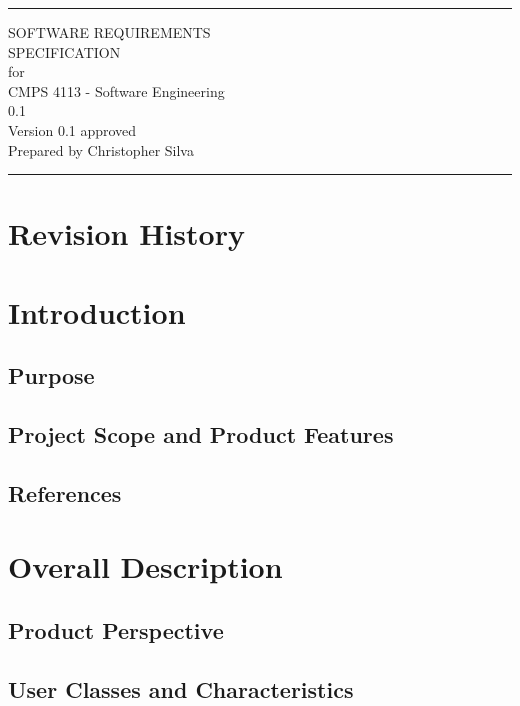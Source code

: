 \documentclass{scrreprt}
\author{Christopher Silva}
\date{}
\def\myversion{0.1 }
\begin{document}
	\begin{titlepage}
		\flushright
		\rule{16cm}{5pt}\vskip1cm
		\Huge{SOFTWARE REQUIREMENTS\\ SPECIFICATION}\\
		\vspace{2cm}
		for\\
		\vspace{2cm}
		CMPS 4113 - Software Engineering\\
		\vspace{2cm}
		\LARGE{\myversion\\}
		\vspace{2cm}
		\LARGE{Version \myversion approved\\}
		\vspace{2cm}
		Prepared by Christopher Silva\\
		\vfill
		\rule{16cm}{5pt}
	\end{titlepage}
	\tableofcontents
	\chapter*{Revision History}
	\chapter{Introduction}
	\section{Purpose}
	\section{Project Scope and Product Features}
	\section{References}
	\chapter{Overall Description}
	\section{Product Perspective}
	\section{User Classes and Characteristics}
\end{document}
